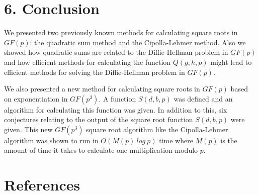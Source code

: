 \documentclass[final,letterpaper,oneside,10pt]{article}
\begin{document}
\section*{6. Conclusion }

We presented two previously known methods for calculating square roots in $GF(p)$: the quadratic sum method and the Cipolla-Lehmer method.
Also we showed how quadratic sums are related to the Diffie-Hellman problem in $GF(p)$ and how efficient methods for calculating the function 
$Q(g,h,p)$ might lead to efficient methods for solving the Diffie-Hellman problem in $GF(p)$.

We also presented a new method for calculating square roots in $GF(p)$ based on exponentiation in $GF(p^3)$.  A function $S(d,b,p)$ was defined and
an algorithm for calculating this function was given.  In addition to this, six conjectures relating to the output of the square root function $S(d,b,p)$
were given.  This new $GF(p^3)$ square root algorithm like the Cipolla-Lehmer algorithm was shown to run in $O(M(p)~log~p)$ time where $M(p)$ is
the amount of time it takes to calculate one multiplication modulo $p$.
\\
\section*{References }
\end{document}
